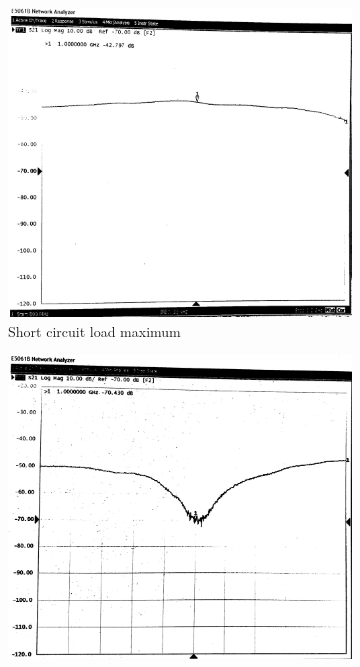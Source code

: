 \documentclass[10pt]{article}
\begin{document}
\pagebreak
\begin{figure}
  \centering
  \begin{subfigure}[b]{0.45\textwidth}
      \includegraphics[width=\textwidth]{../photos/lab2/short-cir-peak.jpg}
      \caption{Short circuit load maximum}
  \end{subfigure}
  \quad
  \begin{subfigure}[b]{0.45\textwidth}
      \includegraphics[width=\textwidth]{../photos/lab2/short-cir-valley.jpg}

\end{subfigure}
\end{figure}
\end{document}
